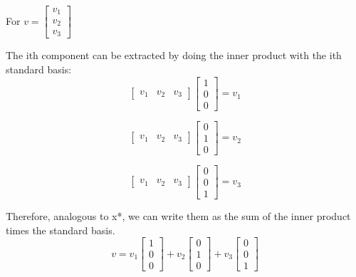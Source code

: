     \begin{example}
        For $v = \begin{bmatrix}
        v_1 \\
        v_2 \\
        v_3
        \end{bmatrix}$
        \vspace{1em}

        The ith component can be extracted by doing the inner product with the ith standard basis:
        \[
        \begin{bmatrix}
        v_1 & v_2 & v_3
        \end{bmatrix}
        \begin{bmatrix}
        1 \\
        0 \\
        0
        \end{bmatrix}
        = v_1
        \]

        \[
        \begin{bmatrix}
        v_1 & v_2 & v_3
        \end{bmatrix}
        \begin{bmatrix}
        0 \\
        1 \\
        0
        \end{bmatrix}
        = v_2
        \]

        \[
        \begin{bmatrix}
        v_1 & v_2 & v_3
        \end{bmatrix}
        \begin{bmatrix}
        0 \\
        0 \\
        1
        \end{bmatrix}
        = v_3
        \]
        \vspace{1em}

        Therefore, analogous to x*, we can write them as the sum of the inner product times the standard basis.
        \[
        v = v_1
        \begin{bmatrix}
        1 \\
        0 \\
        0
        \end{bmatrix}
        + v_2
        \begin{bmatrix}
        0 \\
        1 \\
        0
        \end{bmatrix}
        + v_3
        \begin{bmatrix}
        0 \\
        0 \\
        1
        \end{bmatrix}
        \]
    \end{example}
    
